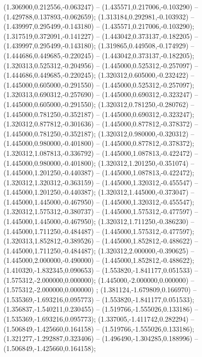  (1.306900,0.212556,-0.063247) -- (1.435571,0.217006,-0.103290) -- (1.429788,0.137893,-0.062659);
 (1.313184,0.292981,-0.103932) -- (1.439997,0.295499,-0.143180) -- (1.435571,0.217006,-0.103290);
 (1.317519,0.372091,-0.141227) -- (1.443042,0.373137,-0.182205) -- (1.439997,0.295499,-0.143180);
 (1.319865,0.449508,-0.174929) -- (1.444686,0.449685,-0.220245) -- (1.443042,0.373137,-0.182205);
 (1.320313,0.525312,-0.204956) -- (1.445000,0.525312,-0.257097) -- (1.444686,0.449685,-0.220245);
 (1.320312,0.605000,-0.232422) -- (1.445000,0.605000,-0.291550) -- (1.445000,0.525312,-0.257097);
 (1.320313,0.690312,-0.257690) -- (1.445000,0.690312,-0.323247) -- (1.445000,0.605000,-0.291550);
 (1.320312,0.781250,-0.280762) -- (1.445000,0.781250,-0.352187) -- (1.445000,0.690312,-0.323247);
 (1.320312,0.877812,-0.301636) -- (1.445000,0.877812,-0.378372) -- (1.445000,0.781250,-0.352187);
 (1.320312,0.980000,-0.320312) -- (1.445000,0.980000,-0.401800) -- (1.445000,0.877812,-0.378372);
 (1.320312,1.087813,-0.336792) -- (1.445000,1.087813,-0.422472) -- (1.445000,0.980000,-0.401800);
 (1.320312,1.201250,-0.351074) -- (1.445000,1.201250,-0.440387) -- (1.445000,1.087813,-0.422472);
 (1.320312,1.320312,-0.363159) -- (1.445000,1.320312,-0.455547) -- (1.445000,1.201250,-0.440387);
 (1.320312,1.445000,-0.373047) -- (1.445000,1.445000,-0.467950) -- (1.445000,1.320312,-0.455547);
 (1.320312,1.575312,-0.380737) -- (1.445000,1.575312,-0.477597) -- (1.445000,1.445000,-0.467950);
 (1.320312,1.711250,-0.386230) -- (1.445000,1.711250,-0.484487) -- (1.445000,1.575312,-0.477597);
 (1.320313,1.852812,-0.389526) -- (1.445000,1.852812,-0.488622) -- (1.445000,1.711250,-0.484487);
 (1.320312,2.000000,-0.390625) -- (1.445000,2.000000,-0.490000) -- (1.445000,1.852812,-0.488622);
 (1.410320,-1.832345,0.090653) -- (1.553820,-1.841177,0.051533) -- (1.575312,-2.000000,0.000000);
 (1.445000,-2.000000,0.000000) -- (1.575312,-2.000000,0.000000) ;
 (1.381124,-1.679809,0.166970) -- (1.535369,-1.693216,0.095773) -- (1.553820,-1.841177,0.051533);
 (1.356837,-1.540211,0.230455) -- (1.519766,-1.555026,0.133186) -- (1.535369,-1.693216,0.095773);
 (1.337005,-1.411742,0.282294) -- (1.506849,-1.425660,0.164158) -- (1.519766,-1.555026,0.133186);
 (1.321277,-1.292887,0.323406) -- (1.496490,-1.304285,0.188996) -- (1.506849,-1.425660,0.164158);
